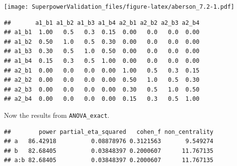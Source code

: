 \documentclass[
]{book}
\newenvironment{Shaded}{\begin{snugshade}}{\end{snugshade}}
\newcommand{\AttributeTok}[1]{\textcolor[rgb]{0.77,0.63,0.00}{#1}}
\newcommand{\ConstantTok}[1]{\textcolor[rgb]{0.00,0.00,0.00}{#1}}
\newcommand{\FunctionTok}[1]{\textcolor[rgb]{0.00,0.00,0.00}{#1}}
\newcommand{\NormalTok}[1]{#1}
\newcommand{\OtherTok}[1]{\textcolor[rgb]{0.56,0.35,0.01}{#1}}
\newcommand{\SpecialCharTok}[1]{\textcolor[rgb]{0.00,0.00,0.00}{#1}}
\newcommand{\StringTok}[1]{\textcolor[rgb]{0.31,0.60,0.02}{#1}}
\begin{document}
\texttt{[image: SuperpowerValidation\_files/figure-latex/aberson\_7.2-1.pdf]}

\begin{Shaded}
\end{Shaded}

\begin{verbatim}
##       a1_b1 a1_b2 a1_b3 a1_b4 a2_b1 a2_b2 a2_b3 a2_b4
## a1_b1  1.00   0.5   0.3  0.15  0.00   0.0   0.0  0.00
## a1_b2  0.50   1.0   0.5  0.30  0.00   0.0   0.0  0.00
## a1_b3  0.30   0.5   1.0  0.50  0.00   0.0   0.0  0.00
## a1_b4  0.15   0.3   0.5  1.00  0.00   0.0   0.0  0.00
## a2_b1  0.00   0.0   0.0  0.00  1.00   0.5   0.3  0.15
## a2_b2  0.00   0.0   0.0  0.00  0.50   1.0   0.5  0.30
## a2_b3  0.00   0.0   0.0  0.00  0.30   0.5   1.0  0.50
## a2_b4  0.00   0.0   0.0  0.00  0.15   0.3   0.5  1.00
\end{verbatim}

Now the results from \texttt{ANOVA\_exact}.

\begin{Shaded}
\end{Shaded}

\begin{verbatim}
##        power partial_eta_squared   cohen_f non_centrality
## a   86.42918          0.08878976 0.3121563       9.549274
## b   82.68405          0.03848397 0.2000607      11.767135
## a:b 82.68405          0.03848397 0.2000607      11.767135
\end{verbatim}

\begin{Shaded}
\end{Shaded}
\end{document}
